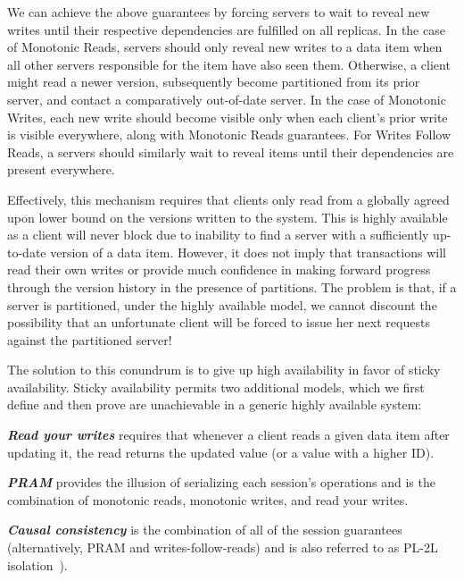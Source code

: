 We can achieve the above guarantees by forcing servers to wait to
reveal new writes until their respective dependencies are fulfilled on
all replicas. In the case of Monotonic Reads, servers should only
reveal new writes to a data item when all other servers responsible
for the item have also seen them. Otherwise, a client might read a
newer version, subsequently become partitioned from its prior server,
and contact a comparatively out-of-date server. In the case of
Monotonic Writes, each new write should become visible only when each
client's prior write is visible everywhere, along with Monotonic Reads
guarantees. For Writes Follow Reads, a servers should similarly wait
to reveal items until their dependencies are present everywhere.

Effectively, this mechanism requires that clients only read from a
globally agreed upon lower bound on the versions written to the
system. This is highly available as a client will never block
due to inability to find a server with a sufficiently up-to-date
version of a data item. However, it does not imply that transactions
will read their own writes or provide much confidence in making
forward progress through the version history in the presence of
partitions. The problem is that, if a server is partitioned, under the
highly available model, we cannot discount the possibility that an
unfortunate client will be forced to issue her next requests against
the partitioned server!

The solution to this conundrum is to give up high availability in
favor of sticky availability. Sticky availability permits two
additional models, which we first define and then prove are
unachievable in a generic highly available system:

\noindent\textit{\textbf{Read your writes}} requires
that whenever a client reads a given data item after updating it, the
read returns the updated value (or a value with a higher ID).

\noindent\textit{\textbf{PRAM}} provides the illusion of serializing
each session's operations and is the combination of monotonic reads,
monotonic writes, and read your writes.

\noindent\textit{\textbf{Causal consistency}} is the combination of
all of the session guarantees~\cite{sessiontocausal} (alternatively,
PRAM and writes-follow-reads) and is also referred to as PL-2L
isolation~\cite{adya}).

